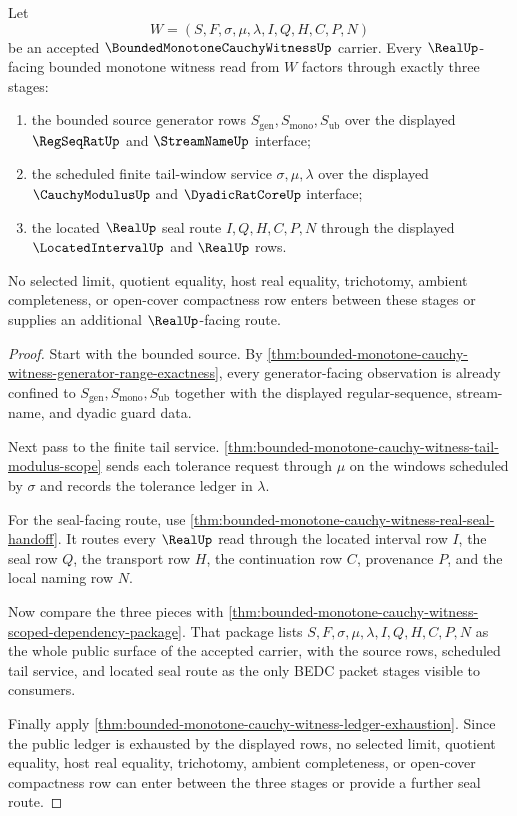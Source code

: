 \begin{theorem}
\label{thm:bounded-monotone-cauchy-witness-source-to-seal-triad}
Let
$$
W=(S,F,\sigma,\mu,\lambda,I,Q,H,C,P,N)
$$
be an accepted $\BoundedMonotoneCauchyWitnessUp$ carrier. Every $\RealUp$-facing bounded monotone witness read from $W$ factors through exactly three stages:
\begin{enumerate}
\item the bounded source generator rows $S_{\mathrm{gen}},S_{\mathrm{mono}},S_{\mathrm{ub}}$ over the displayed $\RegSeqRatUp$ and $\StreamNameUp$ interface;
\item the scheduled finite tail-window service $\sigma,\mu,\lambda$ over the displayed $\CauchyModulusUp$ and $\DyadicRatCoreUp$ interface;
\item the located $\RealUp$ seal route $I,Q,H,C,P,N$ through the displayed $\LocatedIntervalUp$ and $\RealUp$ rows.
\end{enumerate}
No selected limit, quotient equality, host real equality, trichotomy, ambient completeness, or open-cover compactness row enters between these stages or supplies an additional $\RealUp$-facing route.
\end{theorem}
\begin{proof}
Start with the bounded source. By \autoref{thm:bounded-monotone-cauchy-witness-generator-range-exactness}, every generator-facing observation is already confined to $S_{\mathrm{gen}},S_{\mathrm{mono}},S_{\mathrm{ub}}$ together with the displayed regular-sequence, stream-name, and dyadic guard data.

Next pass to the finite tail service. \autoref{thm:bounded-monotone-cauchy-witness-tail-modulus-scope} sends each tolerance request through $\mu$ on the windows scheduled by $\sigma$ and records the tolerance ledger in $\lambda$.

For the seal-facing route, use \autoref{thm:bounded-monotone-cauchy-witness-real-seal-handoff}. It routes every $\RealUp$ read through the located interval row $I$, the seal row $Q$, the transport row $H$, the continuation row $C$, provenance $P$, and the local naming row $N$.

Now compare the three pieces with \autoref{thm:bounded-monotone-cauchy-witness-scoped-dependency-package}. That package lists $S,F,\sigma,\mu,\lambda,I,Q,H,C,P,N$ as the whole public surface of the accepted carrier, with the source rows, scheduled tail service, and located seal route as the only BEDC packet stages visible to consumers.

Finally apply \autoref{thm:bounded-monotone-cauchy-witness-ledger-exhaustion}. Since the public ledger is exhausted by the displayed rows, no selected limit, quotient equality, host real equality, trichotomy, ambient completeness, or open-cover compactness row can enter between the three stages or provide a further seal route.
\end{proof}

